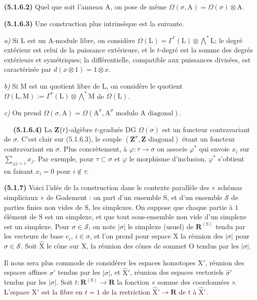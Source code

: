 \documentclass[11pt,leqno]{article}
\newcommand{\Page}[1]{\ifvmode\noindent\else\unskip\ \fi{\footnotesize\textcolor{gray}{[p.\,#1]}}\ \ignorespaces}
\begin{document}
\textbf{(5.1.6.2)} Quel que soit l’anneau \(\mathrm{A}\), on pose de même \(\Omega(\sigma,\mathrm{A})=\Omega(\sigma)\otimes\mathrm{A}\).

\textbf{(5.1.6.3)} Une construction plus intrinsèque est la suivante.

\textit{a)} Si \(\mathrm{L}\) est un \(\mathrm{A}\)-module libre, on considère \(\Omega(\mathrm{L})=\Gamma^*(\mathrm{L})\otimes\bigwedge\limits^{*}\mathrm{L}\); le degré extérieur est celui de la puissance extérieure, et le \(t\)-degré est la somme des degrés extérieurs et symétriques; la différentielle, compatible aux puissances divisées, est caractérisée par \(d(x\otimes1)=1\otimes x\).

\textit{b)} Si \(\mathrm{M}\) est un quotient libre de \(\mathrm{L}\), on considère le quotient \(\Omega(\mathrm{L},\mathrm{M}):=\Gamma^*(\mathrm{L})\otimes\bigwedge\limits^{*}\mathrm{M}\) de \(\Omega(\mathrm{L})\).

\textit{c)} On prend \(\Omega(\sigma,\mathrm{A})=\Omega(\mathrm{A}^{\sigma},\mathrm{A}^{\sigma}\text{ modulo }\mathrm{A}\text{ diagonal})\).

\Page{236}
\textbf{(5.1.6.4)} La \(\mathbf{Z}\{t\}\)-algèbre \(t\)-graduée DG \(\Omega(\sigma)\) est un foncteur contravariant de \(\sigma\). C’est clair sur (5.1.6.3), le couple \((\mathbf{Z}^{\sigma},\mathbf{Z}\text{ diagonal})\) étant un foncteur contravariant en \(\sigma\). Plus concrètement, à \(\varphi:\tau\to\sigma\) on associe \(\varphi^*\) qui envoie \(x_i\) sur \(\sum\limits_{\varphi j=i}x_j\). Par exemple, pour \(\tau\subset\sigma\) et \(\varphi\) le morphisme d’inclusion, \(\varphi^*\) s’obtient en faisant \(x_i=0\) pour \(i\notin\tau\).

\textbf{(5.1.7)} Voici l’idée de la construction dans le contexte parallèle des « schémas simpliciaux » de Godement : on part d’un ensemble \(\mathrm{S}\), et d’un ensemble \(\mathcal{S}\) de parties finies non vides de \(\mathrm{S}\), les simplexes. On suppose que chaque partie à \(1\) élément de \(\mathrm{S}\) est un simplexe, et que tout sous-ensemble non vide d’un simplexe est un simplexe. Pour \(\sigma\in\mathcal{S}\), on note \(|\sigma|\) le simplexe (usuel) de \(\mathbf{R}^{(\mathrm{S})}\) tendu par les vecteurs de base \(e_i\), \(i\in\sigma\), et l’on prend pour espace \(\mathrm{X}\) la réunion des \(|\sigma|\) pour \(\sigma\in\mathcal{S}\). Soit \(\widehat{\mathrm{X}}\) le cône sur \(\mathrm{X}\), la réunion des cônes de sommet \(\mathrm{O}\) tendus par les \(|\sigma|\).

Il nous sera plus commode de considérer les espaces homotopes \(\mathrm{X}'\), réunion des espaces affines \(\sigma'\) tendus par les \(|\sigma|\), et \(\widehat{\mathrm{X}}'\), réunion des espaces vectoriels \(\hat{\sigma}'\) tendus par les \(|\sigma|\). Soit \(t:\mathbf{R}^{(\mathrm{S})}\to\mathbf{R}\) la fonction « somme des coordonnées ». L’espace \(\mathrm{X}'\) est la fibre en \(t=1\) de la restriction \(\widehat{\mathrm{X}}'\to\mathbf{R}\) de \(t\) à \(\widehat{\mathrm{X}}'\).
\end{document}
